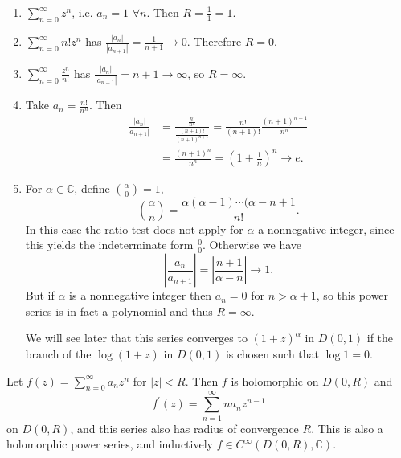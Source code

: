 \begin{xmpl}
  \begin{enumerate}
    \item{
      $\sum_{n=0}^\infty z^n$, i.e. $a_n = 1$ $\forall n$.
      Then $R = \frac{1}{1} = 1$.
    }
    \item{
      $\sum_{n=0}^\infty n! z^n$ has $\frac{|a_n|}{|a_{n+1}|} = \frac{1}{n+1} \to 0$.
      Therefore $R = 0$.
    }
    \item{
      $\sum_{n=0}^\infty \frac{z^n}{n!}$ has $\frac{|a_n|}{|a_{n+1}|} = n + 1 \to \infty$,
      so $R = \infty$.
    }
    \item{
      Take $a_n = \frac{n!}{n^n}$. Then
      \begin{align*}
           \frac{|a_n|}{a_{n+1}|}
        &= \frac{\frac{n!}{n^n}}{\frac{(n+1)!}{(n+1)^{n+1}}}
         = \frac{n!}{(n+1)!}\frac{(n+1)^{n+1}}{n^n} \\
        &= \frac{(n+1)^n}{n^n}
         = (1 + \frac{1}{n})^n \to e.
      \end{align*}
    }
    \item{
      For $\alpha \in \mathbb{C}$, define
      ${\alpha \choose 0} = 1$,
      $$
        {\alpha \choose n}
      = \frac{\alpha(\alpha - 1) \cdots (\alpha - n + 1}
             {n!}.
      $$
      In this case the ratio test does not apply for
      $\alpha$ a nonnegative integer, since this yields the
      indeterminate form $\frac{0}{0}$. Otherwise we have
      $$
          \left|\frac{a_n}{a_{n+1}}\right|
      =   \left|\frac{n+1}{\alpha - n}\right|
      \to 1.
      $$
      But if $\alpha$ is a nonnegative integer then
      $a_n = 0$ for $n > \alpha + 1$, so this power series
      is in fact a polynomial and thus $R = \infty$.

      We will see later that this series converges to
      $(1 + z)^\alpha$ in $D(0, 1)$ if the branch of
      the $\log(1 + z)$ in $D(0, 1)$ is chosen such that
      $\log 1 = 0$.
    }
  \end{enumerate}
\end{xmpl}

\begin{theorem}
  Let $f(z) = \sum_{n=0}^\infty a_n z^n$ for $|z| < R$.
  Then $f$ is holomorphic on $D(0, R)$ and
  $$
  f^\prime(z) = \sum_{n=1}^\infty n a_n z^{n-1}
  $$
  on $D(0, R)$, and this series also has radius of convergence $R$.
  This is also a holomorphic power series, and inductively
  $f \in C^\infty(D(0, R), \mathbb{C})$.
\end{theorem}

